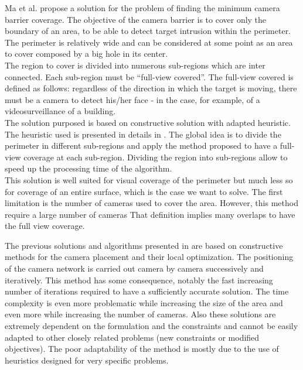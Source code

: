 Ma et al. \cite{37*ma2012} propose a solution for the problem of finding the minimum camera barrier coverage. 
The objective of the camera barrier is to cover only the boundary of an area, to be able to detect target intrusion  within the perimeter. 
The perimeter is relatively wide and can be considered at some point as an area to cover composed by a big hole in its center.\\
 The region to cover is divided into numerous sub-regions which are inter connected. Each sub-region must be “full-view covered”. The full-view covered is defined as follows: regardless of the direction in which the target is moving, there must be a camera to detect his/her face - in the case, for example, of a videosurveillance of a building.\\
The solution purposed is based on constructive solution with adapted heuristic. The heuristic used is presented in details in \cite{37*ma2012}. The global idea is to divide the perimeter in different sub-regions and apply the method proposed to have a full-view coverage at each sub-region. 
Dividing the region into sub-regions allow to speed up the processing time of the algorithm.\\
This solution is well suited  for visual coverage of the perimeter  but much less so for coverage of an entire surface, which is the case we want to solve.  
 The first limitation is the number of cameras used to cover the area. However, this method require a large number of cameras That definition implies many overlaps to have the full view coverage.

The previous solutions and algorithms presented in \cite{38*liu2010, 37*ma2012,81*nikolaidis2009,171*horster2006} are based on constructive methods for the camera placement and their local optimization. The positioning of the camera network  is carried  out camera by camera successively and iteratively.  %
This method has some consequence, notably the fast increasing number of iterations required to have a sufficiently accurate solution. The time complexity is even more problematic while increasing the size of the area and even more while  increasing the number of cameras. Also these solutions are extremely dependent on the formulation and the constraints and cannot be easily adapted to other closely related problems (new constraints  or modified objectives). The poor adaptability   of the method is mostly due to the  use of heuristics designed for very specific problems. 


